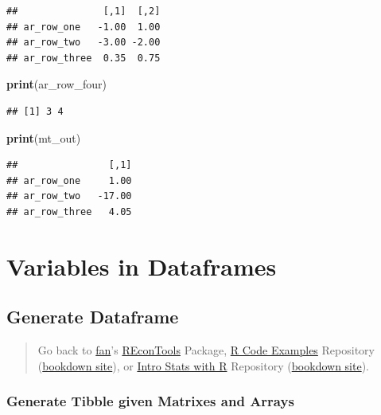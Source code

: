 \documentclass[
]{book}
\newenvironment{Shaded}{\begin{snugshade}}{\end{snugshade}}
\newcommand{\KeywordTok}[1]{\textcolor[rgb]{0.13,0.29,0.53}{\textbf{#1}}}
\newcommand{\NormalTok}[1]{#1}
\begin{document}
\begin{verbatim}
##               [,1]  [,2]
## ar_row_one   -1.00  1.00
## ar_row_two   -3.00 -2.00
## ar_row_three  0.35  0.75
\end{verbatim}

\begin{Shaded}
\begin{Highlighting}[]
\KeywordTok{print}\NormalTok{(ar\_row\_four)}
\end{Highlighting}
\end{Shaded}

\begin{verbatim}
## [1] 3 4
\end{verbatim}

\begin{Shaded}
\begin{Highlighting}[]
\KeywordTok{print}\NormalTok{(mt\_out)}
\end{Highlighting}
\end{Shaded}

\begin{verbatim}
##                [,1]
## ar_row_one     1.00
## ar_row_two   -17.00
## ar_row_three   4.05
\end{verbatim}

\hypertarget{variables-in-dataframes}{%
\section{Variables in Dataframes}\label{variables-in-dataframes}}

\hypertarget{generate-dataframe}{%
\subsection{Generate Dataframe}\label{generate-dataframe}}

\begin{quote}
Go back to \href{http://fanwangecon.github.io/}{fan}'s \href{https://fanwangecon.github.io/REconTools/}{REconTools} Package, \href{https://fanwangecon.github.io/R4Econ/}{R Code Examples} Repository (\href{https://fanwangecon.github.io/R4Econ/bookdown}{bookdown site}), or \href{https://fanwangecon.github.io/Stat4Econ/}{Intro Stats with R} Repository (\href{https://fanwangecon.github.io/Stat4Econ/bookdown}{bookdown site}).
\end{quote}

\hypertarget{generate-tibble-given-matrixes-and-arrays}{%
\subsubsection{Generate Tibble given Matrixes and Arrays}\label{generate-tibble-given-matrixes-and-arrays}}
\end{document}
